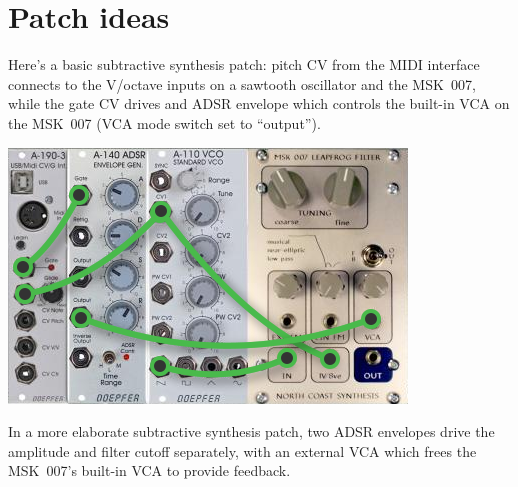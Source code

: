 
%
%
%
%
%
%

\chapter{Patch ideas}

Here's a basic subtractive synthesis patch:  pitch CV from the MIDI
interface connects to the V/octave inputs on a sawtooth oscillator and the
MSK~007, while the gate CV drives and ADSR envelope which controls the
built-in VCA on the MSK~007 (VCA mode switch set to ``output'').

\nopagebreak\noindent
{\hspace*{\fill}\includegraphics[scale=0.6]{patch1.png}\hspace*{\fill}\par} 

In a more elaborate subtractive synthesis patch, two ADSR envelopes drive
the amplitude and filter cutoff separately, with an external VCA which frees
the MSK~007's built-in VCA to provide feedback.

